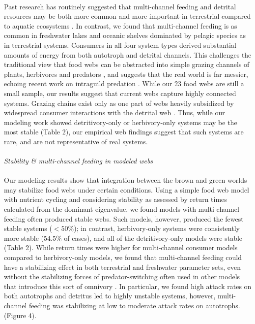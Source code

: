 \documentclass[12pt,a4paper,oneside]{article}
\begin{document}
\\
\indent 
Past research has routinely suggested that multi-channel feeding and detrital
resources may be both more common and more important in
terrestrial compared to aquatic ecosystems \citep{Polis:1996}.  In
contrast, we found that multi-channel feeding is as common in
freshwater lakes and oceanic shelves dominated by pelagic species as
in terrestrial systems. Consumers in all four system types derived substantial amounts of energy from both autotroph
and detrital channels. This challenges the traditional view that food
webs can be abstracted into simple grazing channels of plants,
herbivores and predators \citep{Holt:2006,  Pimm:1982}, and
suggests that the real world is far messier, echoing recent work on 
intraguild predation \citep{Rudolf:2007,miller2011}. While
our 23 food webs are still a small sample, our results
suggest that current webs capture highly connected systems. Grazing
chains exist only as one part of webs heavily subsidized by widespread
consumer interactions with the detrital web \citep{Moore:2004}. Thus, while our modeling work showed detritivory-only or herbivory-only systems may be the most stable (Table 2), our empirical web findings suggest that such systems are rare, and are not representative of real systems.
\\
\\
\noindent \emph{Stability \& multi-channel feeding in modeled webs}\\
\\
\indent Our modeling results show that integration between the brown and
green worlds may stabilize food webs under certain conditions. 
Using a simple food web model with nutrient cycling and considering stability as assessed by return times calculated from the
dominant eigenvalue, we found models with multi-channel feeding often produced
stable webs. Such models, however, produced the fewest stable systems (\(<50\%\)); in contrast, herbivory-only systems were consistently more stable (\(54.5\%\) of cases), and all of the detritivory-only models were stable (Table 2). While return times were higher for multi-channel consumer models compared to herbivory-only models, we found that multi-channel feeding could have a stabilizing effect in both terrestrial and freshwater parameter sets, even without the stabilizing forces of
predator-switching often used in other models that introduce this sort of omnivory
\citep{Rooney:2006}. In particular, we found high attack rates on
both autotrophs and detritus led to highly unstable systems, however, multi-channel feeding was stabilizing at low to moderate attack rates on autotrophs.(Figure 4).
\end{document}
